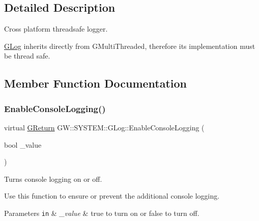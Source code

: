 \subsection{Detailed Description}
Cross platform threadsafe logger. 

\mbox{\hyperlink{class_g_w_1_1_s_y_s_t_e_m_1_1_g_log}{G\+Log}} inherits directly from G\+Multi\+Threaded, therefore its implementation must be thread safe. 

\subsection{Member Function Documentation}
\mbox{\label{class_g_w_1_1_s_y_s_t_e_m_1_1_g_log_a1eb651aa3d5b6b8baac389be284a569d}} 
\subsubsection{\texorpdfstring{Enable\+Console\+Logging()}{EnableConsoleLogging()}}
{\footnotesize\ttfamily virtual \mbox{\hyperlink{namespace_g_w_a67a839e3df7ea8a5c5686613a7a3de21}{G\+Return}} G\+W\+::\+S\+Y\+S\+T\+E\+M\+::\+G\+Log\+::\+Enable\+Console\+Logging (\begin{DoxyParamCaption}\item[{bool}]{\+\_\+value }\end{DoxyParamCaption})\hspace{0.3cm}{\ttfamily [pure virtual]}}



Turns console logging on or off. 

Use this function to ensure or prevent the additional console logging.


\begin{DoxyParams}[1]{Parameters}
\mbox{\tt in}  & {\em \+\_\+value} & true to turn on or false to turn off. \\
\hline
\end{DoxyParams}
\mbox{\label{class_g_w_1_1_s_y_s_t_e_m_1_1_g_log_adea469091bba33b419f7e88a9c2c3049}} 
